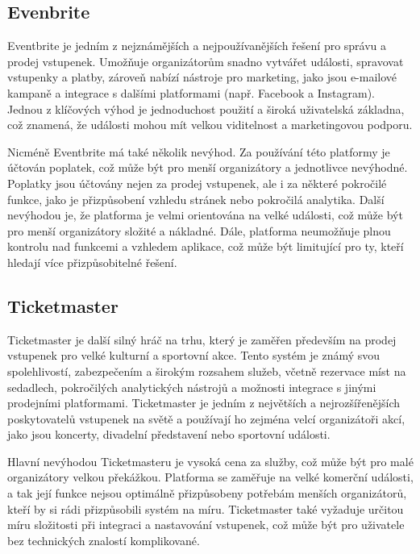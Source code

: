 \documentclass[12pt, a4paper,
twoside,        %
openright
]{report}
\begin{document}
\subsection{Evenbrite}
Eventbrite je jedním z nejznámějších a nejpoužívanějších řešení pro správu a prodej vstupenek. Umožňuje organizátorům snadno vytvářet události, spravovat vstupenky a platby, zároveň nabízí nástroje pro marketing, jako jsou e-mailové kampaně a integrace s dalšími platformami (např. Facebook a Instagram). Jednou z klíčových výhod je jednoduchost použití a široká uživatelská základna, což znamená, že události mohou mít velkou viditelnost a marketingovou podporu.

Nicméně Eventbrite má také několik nevýhod. Za používání této platformy je účtován poplatek, což může být pro menší organizátory a jednotlivce nevýhodné. Poplatky jsou účtovány nejen za prodej vstupenek, ale i za některé pokročilé funkce, jako je přizpůsobení vzhledu stránek nebo pokročilá analytika. Další nevýhodou je, že platforma je velmi orientována na velké události, což může být pro menší organizátory složité a nákladné. Dále, platforma neumožňuje plnou kontrolu nad funkcemi a vzhledem aplikace, což může být limitující pro ty, kteří hledají více přizpůsobitelné řešení.

\pagestyle{plain}
\clearpage

\subsection{Ticketmaster}
Ticketmaster je další silný hráč na trhu, který je zaměřen především na prodej vstupenek pro velké kulturní a sportovní akce. Tento systém je známý svou spolehlivostí, zabezpečením a širokým rozsahem služeb, včetně rezervace míst na sedadlech, pokročilých analytických nástrojů a možnosti integrace s jinými prodejními platformami. Ticketmaster je jedním z největších a nejrozšířenějších poskytovatelů vstupenek na světě a používají ho zejména velcí organizátoři akcí, jako jsou koncerty, divadelní představení nebo sportovní události.

Hlavní nevýhodou Ticketmasteru je vysoká cena za služby, což může být pro malé organizátory velkou překážkou. Platforma se zaměřuje na velké komerční události, a tak její funkce nejsou optimálně přizpůsobeny potřebám menších organizátorů, kteří by si rádi přizpůsobili systém na míru. Ticketmaster také vyžaduje určitou míru složitosti při integraci a nastavování vstupenek, což může být pro uživatele bez technických znalostí komplikované.
\end{document}

